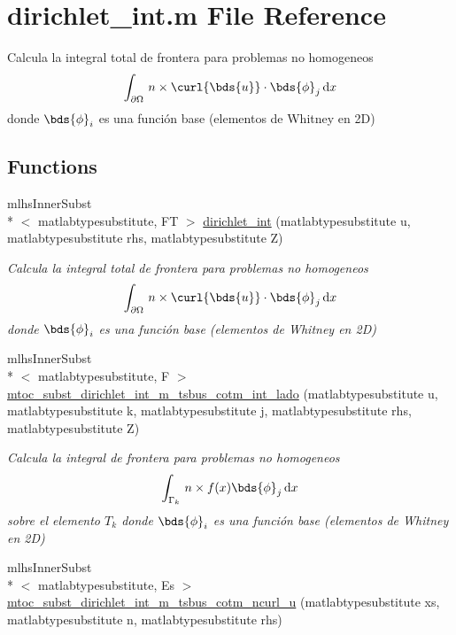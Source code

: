 \hypertarget{a00018}{\section{dirichlet\-\_\-int.\-m File Reference}
\label{a00018}
}


Calcula la integral total de frontera para problemas no homogeneos \[ \int_{ \partial \Omega} \, n \times \curl{\bds{u}} \cdot \bds{\phi}_j \, \mathrm{d}x \] donde $ \bds{\phi}_i $ es una función base (elementos de Whitney en 2\-D)  


\subsection*{Functions}
\begin{DoxyCompactItemize}
\item 
mlhs\-Inner\-Subst\\*
$<$ matlabtypesubstitute, F\-T $>$ \hyperlink{a00018_a9621b6ebc3bb5bf12c40441f3ac49296}{dirichlet\-\_\-int} (matlabtypesubstitute u, matlabtypesubstitute rhs, matlabtypesubstitute Z)
\begin{DoxyCompactList}\small\item\em Calcula la integral total de frontera para problemas no homogeneos \[ \int_{ \partial \Omega} \, n \times \curl{\bds{u}} \cdot \bds{\phi}_j \, \mathrm{d}x \] donde $ \bds{\phi}_i $ es una función base (elementos de Whitney en 2\-D) \end{DoxyCompactList}\item 
mlhs\-Inner\-Subst\\*
$<$ matlabtypesubstitute, F $>$ \hyperlink{a00018_a7cf2e1a404469b4ff7462d92a66e67b0}{mtoc\-\_\-subst\-\_\-dirichlet\-\_\-int\-\_\-m\-\_\-tsbus\-\_\-cotm\-\_\-int\-\_\-lado} (matlabtypesubstitute u, matlabtypesubstitute k, matlabtypesubstitute j, matlabtypesubstitute rhs, matlabtypesubstitute Z)
\begin{DoxyCompactList}\small\item\em Calcula la integral de frontera para problemas no homogeneos \[ \int_{\Gamma_k}\, n \times f(x) \bds{\phi}_j \, \mathrm{d}x \] sobre el elemento $ T_k $ donde $ \bds{\phi}_i $ es una función base (elementos de Whitney en 2\-D) \end{DoxyCompactList}\item 
mlhs\-Inner\-Subst\\*
$<$ matlabtypesubstitute, Es $>$ \hyperlink{a00018_a90097a853874acfe2f32c2a6816c75ff}{mtoc\-\_\-subst\-\_\-dirichlet\-\_\-int\-\_\-m\-\_\-tsbus\-\_\-cotm\-\_\-ncurl\-\_\-u} (matlabtypesubstitute xs, matlabtypesubstitute n, matlabtypesubstitute rhs)
\end{DoxyCompactItemize}



